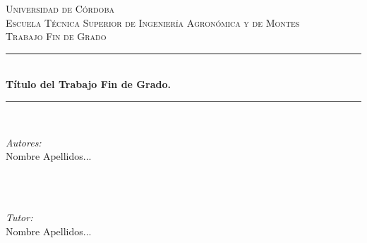 \documentclass[a4paper, 11pt]{article}
\begin{document}


\begin{titlepage}

\newcommand{\HRule}{\rule{\linewidth}{0.5mm}}

\center 
 

\textsc{\LARGE Universidad de Córdoba}\\[1.5cm] %
\textsc{\Large Escuela Técnica Superior de Ingeniería Agronómica y de Montes}\\[0.5cm] %
\textsc{\large Trabajo Fin de Grado}\\[0.5cm] %


\HRule \\[0.4cm]
{ \LARGE \bfseries Título del Trabajo Fin de Grado.}\\[0.4cm] %
\HRule \\[1.5cm]
 

\begin{minipage}{0.5\textwidth}
\begin{center}
\emph{Autores:}\\
Nombre Apellidos... %
\end{center}
\end{minipage}\\[1cm]
~
\begin{minipage}{0.5\textwidth}
\begin{center}
\emph{Tutor:}\\
Nombre Apellidos... %
\end{center}
\end{minipage}\\[1cm]



\end{titlepage}
\end{document}
